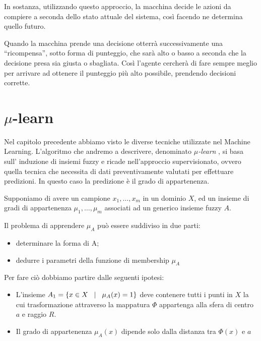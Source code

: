 \documentclass[a4paper,12pt]{report}
\begin{document}
In sostanza, utilizzando questo approccio, la macchina decide le azioni da compiere a seconda dello stato attuale del sistema, così facendo ne determina quello futuro.

Quando la macchina prende una decisione otterrà successivamente una “ricompensa”, sotto forma di punteggio, che sarà alto o basso a seconda che la decisione presa sia giusta o sbagliata. Così l'agente cercherà di fare sempre meglio per arrivare ad ottenere il punteggio più alto possibile, prendendo decisioni corrette.




\section{\texorpdfstring{$\mu$}{mu}-learn}
Nel capitolo precedente abbiamo visto le diverse tecniche utilizzate nel Machine Learning. L’algoritmo che andremo a descrivere, denominato \textit{$\mu$-learn} \cite{mulearn}, si basa sull’ induzione di insiemi fuzzy e ricade nell’approccio supervisionato, ovvero quella tecnica che necessita di dati preventivamente valutati per effettuare predizioni. In questo caso la predizione è il grado di appartenenza.

\bigskip

Supponiamo di avere un campione {$x_1,\dots,x_m$} in un dominio $X$, ed un insieme di gradi di appartenenza {$\mu_1,\dots,\mu_m$} associati ad un generico insieme fuzzy $A$. 

Il problema di apprendere $\mu_A$ può essere suddiviso in due parti:
\begin{itemize}
    \item determinare la forma di A;
    \item dedurre i parametri della funzione di membership $\mu_A$
\end{itemize}

Per fare ciò dobbiamo partire dalle seguenti ipotesi:
\begin{itemize}
    \item L'insieme $A_1 = \{ x\in X \hspace{0,3cm} |\hspace{0,3cm} \mu_A(x) = 1 \}$ deve contenere tutti i punti in $X$ la cui trasformazione attraverso la mappatura $\Phi$ appartenga alla sfera di centro $a$ e raggio $R$.
    
    \item Il grado di appartenenza $\mu_A(x)$ dipende solo dalla distanza tra $\Phi(x)$ e $a$
\end{itemize}
\end{document}

